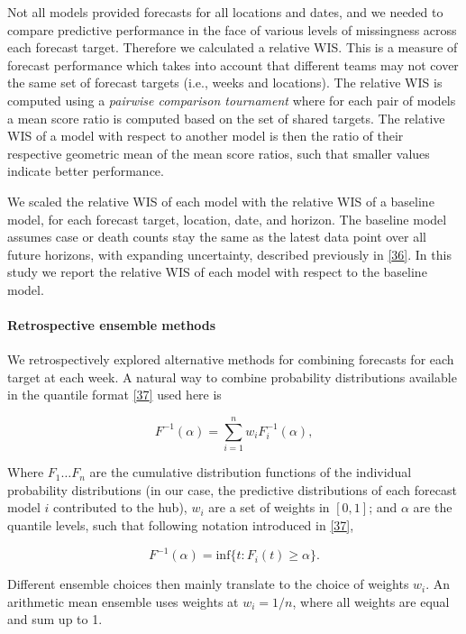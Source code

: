 \documentclass[
]{article}
\begin{document}
Not all models provided forecasts for all locations and dates, and we needed to compare predictive performance in the face of various levels of missingness across each forecast target. Therefore we calculated a relative WIS. This is a measure of forecast performance which takes into account that different teams may not cover the same set of forecast targets (i.e., weeks and locations). The relative WIS is computed using a \emph{pairwise comparison tournament} where for each pair of models a mean score ratio is computed based on the set of shared targets. The relative WIS of a model with respect to another model is then the ratio of their respective geometric mean of the mean score ratios, such that smaller values indicate better performance.

We scaled the relative WIS of each model with the relative WIS of a baseline model, for each forecast target, location, date, and horizon. The baseline model assumes case or death counts stay the same as the latest data point over all future horizons, with expanding uncertainty, described previously in \protect\hyperlink{ref-cramerEvaluationIndividualEnsemble2021}{{[}36{]}}. In this study we report the relative WIS of each model with respect to the baseline model.

\hypertarget{retrospective-ensemble-methods}{%
\paragraph{Retrospective ensemble methods}\label{retrospective-ensemble-methods}}

We retrospectively explored alternative methods for combining forecasts for each target at each week. A natural way to combine probability distributions available in the quantile format \protect\hyperlink{ref-genestVincentizationRevisited1992}{{[}37{]}} used here is

\[F^{-1}(\alpha) = \sum_{i=1}^{n}w_i F_i^{-1}(\alpha),\]

Where \(F_{1} \ldots F_{n}\) are the cumulative distribution functions of the individual probability distributions (in our case, the predictive distributions of each forecast model \(i\) contributed to the hub), \(w_i\) are a set of weights in \([0,1]\); and \(\alpha\) are the quantile levels, such that following notation introduced in \protect\hyperlink{ref-genestVincentizationRevisited1992}{{[}37{]}},

\[F^{-1}(\alpha) = \mathrm{inf} \{t : F_i(t) \geq \alpha \}.\]

Different ensemble choices then mainly translate to the choice of weights \(w_i\). An arithmetic mean ensemble uses weights at \(w_i=1/n\), where all weights are equal and sum up to 1.
\end{document}
